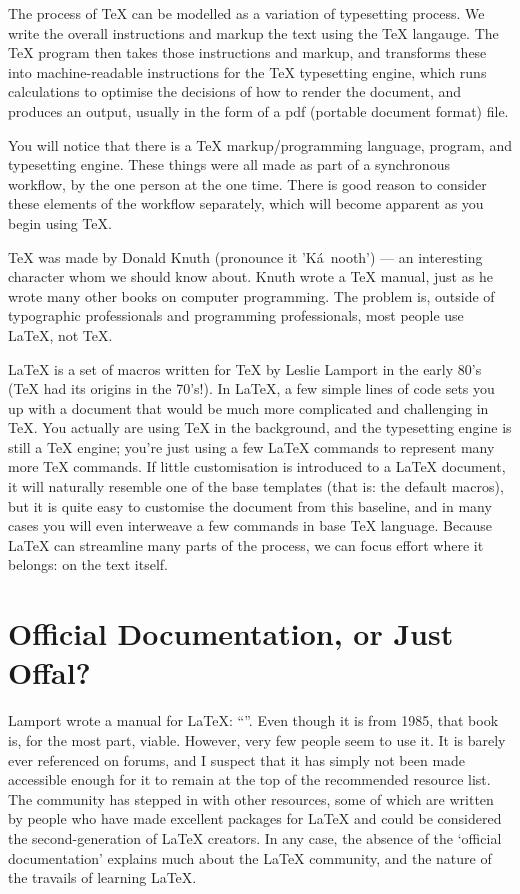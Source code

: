 \documentclass[12pt, oneside]{memoir}
\begin{document}
The process of \TeX{} can be modelled as a variation of typesetting process. We write the overall instructions and markup the text using the \TeX{} langauge. The \TeX{} program then takes those instructions and markup, and transforms these into machine-readable instructions for the \TeX{} typesetting engine, which runs calculations to optimise the decisions of how to render the document, and produces an output, usually in the form of a pdf (portable document format) file.

You will notice that there is a \TeX{} markup/programming language, program, and typesetting engine. These things were all made as part of a synchronous workflow, by the one person at the one time. There is good reason to consider these elements of the workflow separately, which will become apparent as you begin using \TeX{}.

\TeX{} was made by Donald Knuth (pronounce it 'Ká~nooth') — an interesting character whom we should know about. Knuth wrote a \TeX{} manual, just as he wrote many other books on computer programming. The problem is, outside of typographic professionals and programming professionals, most people use \LaTeX{}, not \TeX{}.

\LaTeX{} is a set of macros written for \TeX{} by Leslie Lamport in the early 80's (\TeX{} had its origins in the 70's!). In LaTeX{}, a few simple lines of code sets you up with a document that would be much more complicated and challenging in \TeX{}. You actually are using \TeX{} in the background, and the typesetting engine is still a \TeX{} engine; you're just using a few \LaTeX{} commands to represent many more \TeX{} commands. If little customisation is introduced to a \LaTeX{} document, it will naturally resemble one of the base templates (that is: the default macros), but it is quite easy to customise the document from this baseline, and in many cases you will even interweave a few commands in base \TeX{} language. Because \LaTeX{} can streamline many parts of the process, we can focus effort where it belongs: on the text itself.

\section*{Official Documentation, or Just Offal?}

Lamport wrote a manual for \LaTeX{}: ``''. Even though it is from 1985, that book is, for the most part, viable. However, very few people seem to use it. It is barely ever referenced on forums, and I suspect that it has simply not been made accessible enough for it to remain at the top of the recommended resource list. The community has stepped in with other resources, some of which are written by people who have made excellent packages for \LaTeX{} and could be considered the second-generation of \LaTeX{} creators. In any case, the absence of the `official documentation' explains much about the \LaTeX{} community, and the nature of the travails of learning \LaTeX{}.
\end{document}
